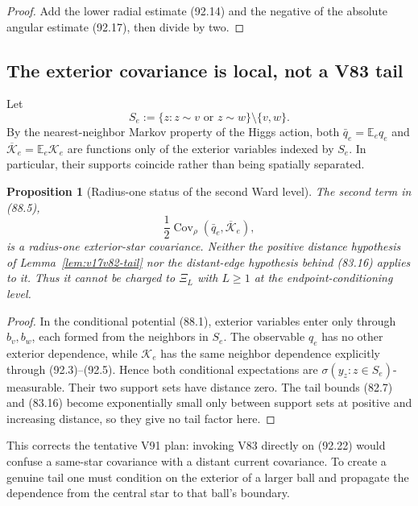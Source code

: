\documentclass[11pt]{article}
\newtheorem{proposition}[theorem]{Proposition}
\theoremstyle{remark}
\begin{document}
\begin{proof}
Add the lower radial estimate (92.14) and the negative of the absolute
angular estimate (92.17), then divide by two.
\end{proof}

\subsection{The exterior covariance is local, not a V83 tail}

Let
\[
 S_e:=\{z:z\sim v\text{ or }z\sim w\}\setminus\{v,w\}.             \tag{92.21}
\]
By the nearest-neighbor Markov property of the Higgs action, both
\(\bar q_e=\mathbb E_e q_e\) and
\(\overline{\mathcal K}_e=\mathbb E_e\mathcal K_e\) are functions
only of the exterior variables indexed by \(S_e\).  In particular,
their supports coincide rather than being spatially separated.

\begin{proposition}[Radius-one status of the second Ward level]
\label{prop:v17v92-radius-one}
The second term in (88.5),
\[
 \frac12\operatorname{Cov}_\rho
  (\bar q_e,\overline{\mathcal K}_e),                \tag{92.22}
\]
is a radius-one exterior-star covariance.  Neither the positive
distance hypothesis of Lemma~\ref{lem:v17v82-tail} nor the distant-edge
hypothesis behind (83.16) applies to it.  Thus it cannot be charged to
\(\Xi_L\) with \(L\geq1\) at the endpoint-conditioning level.
\end{proposition}

\begin{proof}
In the conditional potential (88.1), exterior variables enter only
through \(b_v,b_w\), each formed from the neighbors in \(S_e\).
The observable \(q_e\) has no other exterior dependence, while
\(\mathcal K_e\) has the same neighbor dependence explicitly through
(92.3)--(92.5).  Hence both conditional expectations are
\(\sigma(y_z:z\in S_e)\)-measurable.  Their two support sets have
distance zero.  The tail bounds (82.7) and (83.16) become exponentially
small only between support sets at positive and increasing distance,
so they give no tail factor here.
\end{proof}

This corrects the tentative V91 plan: invoking V83 directly on
(92.22) would confuse a same-star covariance with a distant current
covariance.  To create a genuine tail one must condition on the
exterior of a larger ball and propagate the dependence from the
central star to that ball's boundary.
\end{document}

